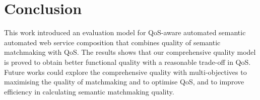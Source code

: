 \documentclass{IEEEtran}
\begin{document}
\section{Conclusion}\label{conclusion}
This work introduced an evaluation model for QoS-aware automated semantic automated web service composition that combines quality of semantic matchmaking with QoS. The results shows that our comprehensive quality model is proved to obtain better functional quality with a reasonable trade-off in QoS. Future works could explore the comprehensive quality with multi-objectives to maximising the quality of matchmaking and to optimise QoS, and to improve efficiency in calculating semantic matchmaking quality.


\end{document}
